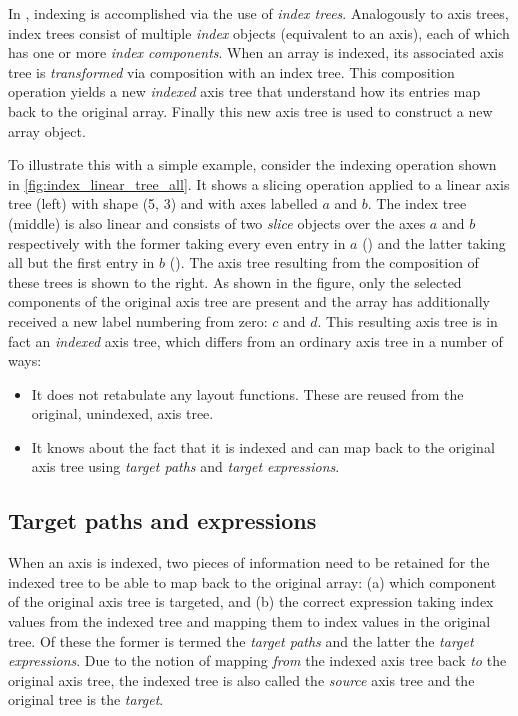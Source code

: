 \documentclass[thesis]{subfiles}
\begin{document}
In , indexing is accomplished via the use of \textit{index trees}.
Analogously to axis trees, index trees consist of multiple \textit{index} objects (equivalent to an axis), each of which has one or more \textit{index components}.
When an array is indexed, its associated axis tree is \textit{transformed} via composition with an index tree.
This composition operation yields a new \textit{indexed} axis tree that understand how its entries map back to the original array.
Finally this new axis tree is used to construct a new array object.

To illustrate this with a simple example, consider the indexing operation shown in \cref{fig:index_linear_tree_all}.
It shows a slicing operation applied to a linear axis tree (left) with shape (5, 3) and with axes labelled $a$ and $b$.
The index tree (middle) is also linear and consists of two \textit{slice} objects over the axes $a$ and $b$ respectively with the former taking every even entry in $a$ () and the latter taking all but the first entry in $b$ ().
The axis tree resulting from the composition of these trees is shown to the right.
As shown in the figure, only the selected components of the original axis tree are present and the array has additionally received a new label numbering from zero: $c$ and $d$.
This resulting axis tree is in fact an \textit{indexed} axis tree, which differs from an ordinary axis tree in a number of ways:
\begin{itemize}
  \item
    It does not retabulate any layout functions. These are reused from the original, unindexed, axis tree.
  \item
    It knows about the fact that it is indexed and can map back to the original axis tree using \textit{target paths} and \textit{target expressions}.
\end{itemize}

\subsection{Target paths and expressions}

When an axis is indexed, two pieces of information need to be retained for the indexed tree to be able to map back to the original array:
(a) which component of the original axis tree is targeted, and
(b) the correct expression taking index values from the indexed tree and mapping them to index values in the original tree.
Of these the former is termed the \textit{target paths} and the latter the \textit{target expressions}.
Due to the notion of mapping \textit{from} the indexed axis tree back \textit{to} the original axis tree, the indexed tree is also called the \textit{source} axis tree and the original tree is the \textit{target}.
\end{document}
